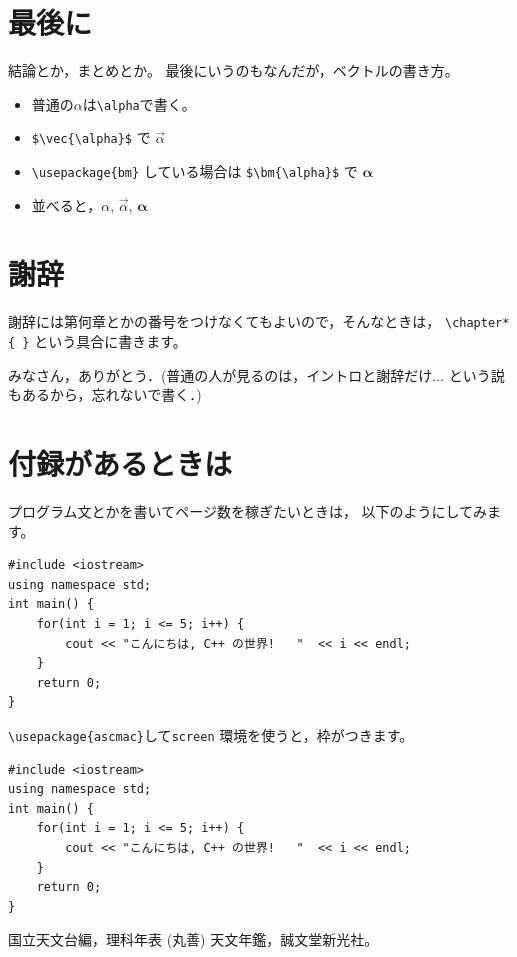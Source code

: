 \documentclass[a4paper,12pt]{jsreport}
\begin{document}
\chapter{最後に}

結論とか，まとめとか。
最後にいうのもなんだが，ベクトルの書き方。
\begin{itemize}
  \item 普通の$\alpha$は\verb|\alpha|で書く。
  \item \verb|$\vec{\alpha}$| で $\vec{\alpha}$
  \item \verb|\usepackage{bm}| している場合は
        \verb|$\bm{\alpha}$| で $\bm{\alpha}$
  \item 並べると，$\alpha$, $\vec{\alpha}$, $\bm{\alpha}$
\end{itemize}


\chapter*{謝辞}

謝辞には第何章とかの番号をつけなくてもよいので，そんなときは，
\verb|\chapter*{ }| という具合に書きます。

みなさん，ありがとう．(普通の人が見るのは，イントロと謝辞だけ... 
という説もあるから，忘れないで書く．)

\appendix
\chapter{付録があるときは}
プログラム文とかを書いてページ数を稼ぎたいときは，
以下のようにしてみます。

\begin{verbatim}
#include <iostream>
using namespace std;
int main() {  
    for(int i = 1; i <= 5; i++) {
        cout << "こんにちは, C++ の世界!   "  << i << endl;
    }
    return 0;
}
\end{verbatim}
\verb|\usepackage{ascmac}|して\verb|screen| 環境を使うと，枠がつきます。
\begin{screen}
\begin{verbatim}
#include <iostream>
using namespace std;
int main() {  
    for(int i = 1; i <= 5; i++) {
        cout << "こんにちは, C++ の世界!   "  << i << endl;
    }
    return 0;
}
\end{verbatim}
\end{screen}

\begin{thebibliography}{99}
 国立天文台編，理科年表 (丸善)
 天文年鑑，誠文堂新光社。
\end{thebibliography}
\end{document}
